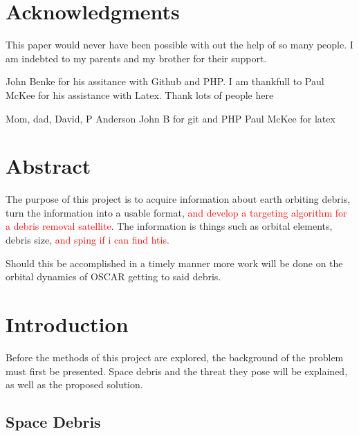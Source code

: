 \documentclass[12pt]{report}
\begin{document}
	\section{Acknowledgments}
	
	This paper would never have been possible with out the help of so many people. 
	I am indebted to my parents and my brother for their support. 
	
	John Benke for his assitance with Github and PHP. I am thankfull to Paul McKee for his assistance with Latex. 
	Thank lots of people here\par 
	
	Mom, dad, David,
	P Anderson
	John B for git and PHP
	Paul McKee for latex 
	
	
	
	

	
	
	\newpage
	\section{Abstract}
	The purpose of this project is to acquire information about earth orbiting debris, turn the information into a usable format, \textcolor{red}{and develop a targeting algorithm for a debris removal satellite}. The information is things such as orbital elements, debris size, \textcolor{red}{ and sping if i can find htis.} \par 
	 Should this be accomplished in a timely manner more work will be done on the orbital dynamics of OSCAR getting to said debris.
	\newpage
	\section{Introduction}
	Before the methods of this project are explored, the background of the problem must first be presented. Space debris and the threat they pose will be explained, as well as the proposed solution. 
	

	\subsection{Space Debris}
	
\end{document}

